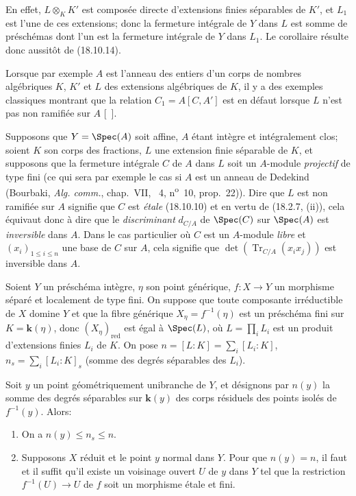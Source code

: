 En effet, $L\otimes_K K'$ est composée directe d'extensions finies séparables de $K'$, et $L_1$
est l'une de ces extensions; donc la fermeture intégrale de $Y$ dans $L$ est somme de préschémas dont l'un est la fermeture intégrale de $Y$ dans $L_1$. Le corollaire résulte donc aussitôt de (18.10.14).

Lorsque par exemple $A$ est l'anneau des entiers d'un corps de nombres algébriques $K$, $K'$ et $L$ des extensions algébriques de $K$, il y a des exemples classiques montrant que la relation $C_1=A[C,A']$ est en défaut lorsque $L$ n'est pas non ramifiée sur $A$ [\ ].

\begin{env}[18.10.15]
\label{IV.18.10.15}
Supposons que $Y=\Spec(A)$ soit affine, $A$ étant intègre et intégralement clos; soient $K$ son corps des fractions, $L$ une extension finie séparable de $K$, et supposons que la fermeture intégrale $C$ de $A$ dans $L$ soit un $A$-module \emph{projectif} de type fini (ce qui sera par exemple le cas si $A$ est un anneau de Dedekind (Bourbaki, \emph{Alg. comm.}, chap.~VII, \textsection~4, n\textsuperscript{o}~10, prop.~22)). Dire que $L$ est non ramifiée sur $A$ signifie que $C$ est \emph{étale} (18.10.10) et en vertu de (18.2.7, (ii)), cela équivaut donc à dire que le \emph{discriminant} $d_{C/A}$ de $\Spec(C)$ sur $\Spec(A)$ est \emph{inversible} dans $A$. Dans le cas particulier où $C$ est un $A$-module \emph{libre} et $(x_i)_{1\leq i\leq n}$ une base de $C$ sur $A$, cela signifie que $\det(\operatorname{Tr}_{C/A}(x_ix_j))$ est inversible dans $A$.
\end{env}

\begin{theorem}[18.10.16]
\label{IV.18.10.16}
Soient $Y$ un préschéma intègre, $\eta$ son point générique, $f:X\to Y$ un morphisme séparé et localement de type fini. On suppose que toute composante irréductible de $X$ domine $Y$ et que la fibre générique $X_\eta=f^{-1}(\eta)$ est un préschéma fini sur $K=\boldsymbol{k}(\eta)$, donc $(X_\eta)_{\mathrm{red}}$ est égal à $\Spec(L)$, où $L=\prod_iL_i$ est un produit d'extensions finies $L_i$ de $K$. On pose $n=[L:K]=\sum_i[L_i:K]$, $n_s=\sum_i[L_i:K]_s$ \textup{(somme des degrés séparables des $L_i$)}.

Soit $y$ un point \textup{géométriquement unibranche} de $Y$, et désignons par $n(y)$ la somme des degrés séparables sur $\boldsymbol{k}(y)$ des corps résiduels des points \textup{isolés} de $f^{-1}(y)$. Alors:
\begin{enumerate}
  \item[\textup{(i)}] On a $n(y)\leq n_s\leq n$.
  \item[\textup{(ii)}] Supposons $X$ réduit et le point $y$ normal dans $Y$. Pour que $n(y)=n$, il faut et il suffit qu'il existe un voisinage ouvert $U$ de $y$ dans $Y$ tel que la restriction $f^{-1}(U)\to U$ de $f$ soit un morphisme étale et fini.
\end{enumerate}
\end{theorem}

